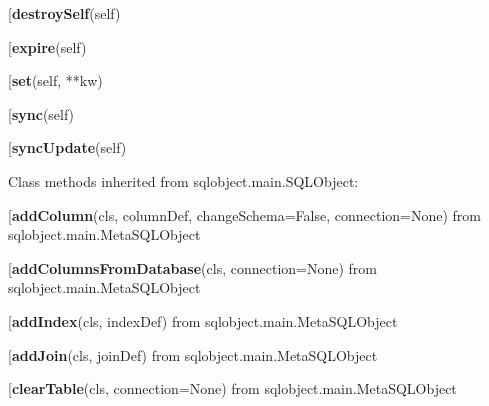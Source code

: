 \begin{description}\item[{\bf destroySelf}(self)\end{description}

\begin{description}\item[{\bf expire}(self)\end{description}

\begin{description}\item[{\bf set}(self, **kw)\end{description}

\begin{description}\item[{\bf sync}(self)\end{description}

\begin{description}\item[{\bf syncUpdate}(self)\end{description}


Class methods inherited from sqlobject.main.SQLObject:\\
\begin{description}\item[{\bf addColumn}(cls, columnDef, changeSchema=False, connection=None) from sqlobject.main.MetaSQLObject\end{description}

\begin{description}\item[{\bf addColumnsFromDatabase}(cls, connection=None) from sqlobject.main.MetaSQLObject\end{description}

\begin{description}\item[{\bf addIndex}(cls, indexDef) from sqlobject.main.MetaSQLObject\end{description}

\begin{description}\item[{\bf addJoin}(cls, joinDef) from sqlobject.main.MetaSQLObject\end{description}

\begin{description}\item[{\bf clearTable}(cls, connection=None) from sqlobject.main.MetaSQLObject\end{description}

